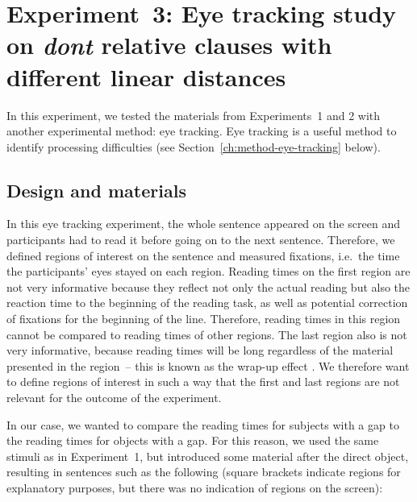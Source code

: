 \section[head=Experiment~3]{Experiment~3: Eye tracking study on \emph{dont} relative clauses with different linear distances}
\label{ch:exp03}

In this experiment, we tested the materials from Experiments~1 and 2 with another experimental method: eye tracking. Eye tracking is a useful method to identify processing difficulties (see Section~\ref{ch:method-eye-tracking} below).

\subsection{Design and materials}

In this eye tracking experiment, the whole sentence appeared on the screen and participants had to read it before going on to the next sentence. Therefore, we defined regions of interest on the sentence and measured fixations, i.e.\ the time the participants' eyes stayed on each region. Reading times on the first region are not very informative because they reflect not only the actual reading but also the reaction time to the beginning of the reading task, as well as potential correction of fixations for the beginning of the line. Therefore, reading times in this region cannot be compared to reading times of other regions. The last region also is not very informative, because reading times will be long regardless of the material presented in the region~-- this is known as the wrap-up effect \citep{Rayner.1995}. We therefore want to define regions of interest in such a way that the first and last regions are not relevant for the outcome of the experiment.

In our case, we wanted to compare the reading times for subjects with a gap to the reading times for objects with a gap. For this reason, we used the same stimuli as in Experiment~1, but introduced some material after the direct object, resulting in sentences such as the following (square brackets indicate regions for explanatory purposes, but there was no indication of regions on the screen):

